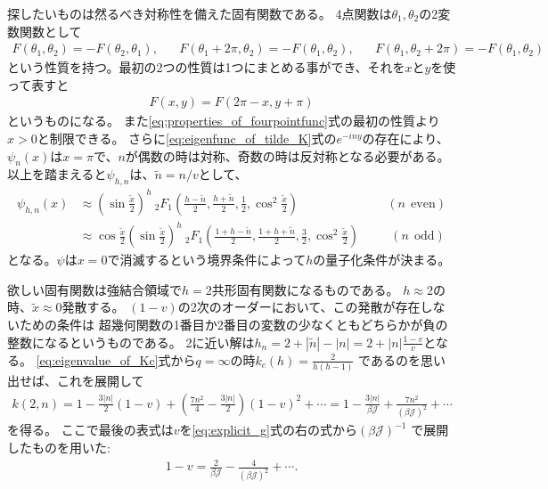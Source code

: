 探したいものは然るべき対称性を備えた固有関数である。
4点関数は$\theta_1, \theta_2$の2変数関数として
\begin{align}
	F(\theta_1, \theta_2) = -F(\theta_2, \theta_1),\hspace{20pt}
	F(\theta_1 + 2\pi, \theta_2) = -F(\theta_1, \theta_2),\hspace{20pt}
	F(\theta_1, \theta_2 + 2\pi) = -F(\theta_1, \theta_2)
	\label{eq:properties_of_fourpointfunc}
\end{align}
という性質を持つ。最初の2つの性質は1つにまとめる事ができ、それを$x$と$y$を使って表すと
\begin{align}
	F(x, y) = F(2\pi - x, y + \pi)
\end{align}
というものになる。
また\eqref{eq:properties_of_fourpointfunc}式の最初の性質より$x > 0$と制限できる。
さらに\eqref{eq:eigenfunc_of_tilde_K}式の$e^{-iny}$の存在により、
$\psi_n(x)$は$x=\pi$で、$n$が偶数の時は対称、奇数の時は反対称となる必要がある。
以上を踏まえると$\psi_{h,n}$は、$\tilde{n} = n/v$として、
\begin{align}
	\psi_{h,n}(x)
	&\approx \left(\sin\frac{\tilde{x}}{2}\right)^h\ 
	{}_2F_1\left(
		\frac{h-\tilde{n}}{2}, \frac{h+\tilde{n}}{2},
		\frac{1}{2},\cos^2\frac{\tilde{x}}{2}
		\right)\hspace{85pt}(n\ \ \mathrm{even})\\
	&\approx \cos\frac{\tilde{x}}{2}\left(\sin\frac{\tilde{x}}{2}\right)^h\ 
	{}_2F_1\left(
		\frac{1 + h - \tilde{n}}{2},
		\frac{1 + h + \tilde{n}}{2},
		\frac{3}{2},
		\cos^2\frac{\tilde{x}}{2}
		\right)\hspace{30pt}(n\ \ \mathrm{odd})
\end{align}
となる。$\psi$は$x=0$で消滅するという境界条件によって$h$の量子化条件が決まる。

欲しい固有関数は強結合領域で$h=2$共形固有関数になるものである。
$h\approx 2$の時、$\tilde{x}\approx 0$発散する。
$(1-v)$の2次のオーダーにおいて、この発散が存在しないための条件は
超幾何関数の1番目か2番目の変数の少なくともどちらかが負の整数になるというものである。
2に近い解は$h_n = 2 + |\tilde{n}| - |n| = 2 + |n|\frac{1-v}{v}$となる。
\eqref{eq:eigenvalue_of_Kc}式から$q = \infty$の時$k_c(h) = \frac{2}{h(h-1)}$
であるのを思い出せば、これを展開して
\begin{align}
	k(2, n)
	= 1 - \frac{3|n|}{2}(1 - v) + \left(\frac{7n^2}{4} - \frac{3|n|}{2}\right)(1 - v)^2
		+ \cdots
	= 1 - \frac{3|n|}{\beta \mathcal{J}} + \frac{7n^2}{(\beta \mathcal{J})^2} + \cdots
	\label{eq:eigenvalue_at_large_q}
\end{align}
を得る。
ここで最後の表式は$v$を\eqref{eq:explicit_g}式の右の式から$(\beta \mathcal{J})^{-1}$
で展開したものを用いた:
\begin{align}
	1 - v = \frac{2}{\beta\mathcal{J}} - \frac{4}{(\beta\mathcal{J})^2} + \cdots.
\end{align}

